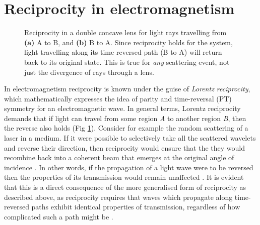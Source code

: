 \section{Reciprocity in electromagnetism}

\begin{figure}
	\centering
	\begin{subfigure}{0.5\textwidth}
		\centering
		
		\caption{}
	\end{subfigure}%
	\begin{subfigure}{0.5\textwidth}
		\centering
		
		\caption{}
	\end{subfigure}%
	\caption[Time-reversed path in a double concave lens]{Reciprocity in a double concave lens for light rays travelling from \textbf{(a)} A to B, and \textbf{(b)} B to A. Since reciprocity holds for the system, light travelling along its time reversed path (B to A) will return back to its original state. This is true for \textit{any} scattering event, not just the divergence of rays through a lens.}
	\label{fig:reciprocity}
\end{figure}

In electromagnetism reciprocity is known under the guise of \textit{Lorentz reciprocity}, which mathematically expresses the idea of parity and time-reversal (PT) symmetry for an electromagnetic wave. In general terms, Lorentz reciprocity demands that if light can travel from some region \textit{A} to another region \textit{B}, then the reverse also holds (Fig \ref{fig:reciprocity}). Consider for example the random scattering of a laser in a medium. If it were possible to selectively take all the scattered wavelets and reverse their direction, then reciprocity would ensure that the they would recombine back into a coherent beam that emerges at the original angle of incidence \cite{Wiersma2013a}. In other words, if the propagation of a light wave were to be reversed then the properties of its transmission would remain unaffected \cite{Potton2004a}. It is evident that this is a direct consequence of the more generalised form of reciprocity as described above, as reciprocity requires that waves which propagate along time-reversed paths exhibit identical properties of transmission, regardless of how complicated such a path might be \cite{Buehler2016}.

